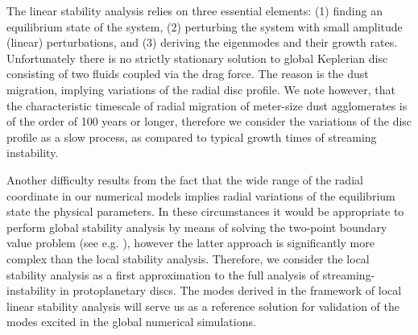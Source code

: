 The linear stability analysis relies on three essential elements: (1) finding an
equilibrium state of the system, (2) perturbing the system with small amplitude
(linear) perturbations, and (3) deriving the eigenmodes and their growth rates. 
Unfortunately there is no strictly stationary solution to global Keplerian disc
consisting of two fluids coupled via the drag force. 
The reason is the dust migration, implying variations of the radial disc profile.
We note however, that the characteristic timescale of radial
migration of meter-size dust agglomerates is of the order of 100 years or
longer, therefore we consider the variations of the disc profile as a
slow process, as compared to typical growth times of  streaming instability.

Another difficulty results from the fact that the wide range of the radial
coordinate in our numerical models implies radial variations of the equilibrium
state the physical parameters. In these circumstances it would be appropriate to
perform global stability analysis by means of solving the two-point boundary
value problem (see e.g. \cite{PHM04, KH06}), however the latter approach is
significantly more complex than the local stability analysis. Therefore, we
consider the local stability analysis as a first approximation to the full
analysis of streaming-instability in protoplanetary discs. The modes derived in
the framework of local linear stability analysis will serve us as a reference
solution for validation of the modes excited in the global numerical
simulations.

